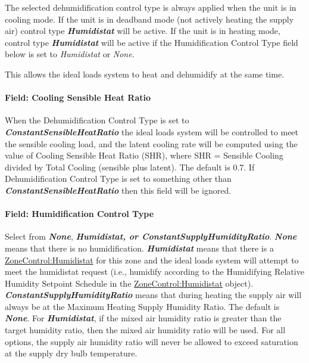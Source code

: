 The selected dehumidification control type is always applied when the unit is in cooling mode. If the unit is in deadband mode (not actively heating the supply air) control type \textbf{\emph{Humidistat}} will be active. If the unit is in heating mode, control type \textbf{\emph{Humidistat}} will be active if the Humidification Control Type field below is set to \emph{Humidistat} or \emph{None}.

This allows the ideal loads system to heat and dehumidify at the same time.

\paragraph{Field: Cooling Sensible Heat Ratio}\label{field-cooling-sensible-heat-ratio-000}

When the Dehumidification Control Type is set to \textbf{\emph{ConstantSensibleHeatRatio}} the ideal loads system will be controlled to meet the sensible cooling load, and the latent cooling rate will be computed using the value of Cooling Sensible Heat Ratio (SHR), where SHR = Sensible Cooling divided by Total Cooling (sensible plus latent). The default is 0.7. If Dehumidification Control Type is set to something other than \textbf{\emph{ConstantSensibleHeatRatio}} then this field will be ignored.

\paragraph{Field: Humidification Control Type}\label{field-humidification-control-type-000}

Select from \textbf{\emph{None}}, \textbf{\emph{Humidistat, or ConstantSupplyHumidityRatio}}. \textbf{\emph{None}} means that there is no humidification. \textbf{\emph{Humidistat}} means that there is a \hyperref[zonecontrolhumidistat]{ZoneControl:Humidistat} for this zone and the ideal loads system will attempt to meet the humidistat request (i.e., humidify according to the Humidifying Relative Humidity Setpoint Schedule in the \hyperref[zonecontrolhumidistat]{ZoneControl:Humidistat} object). \textbf{\emph{ConstantSupplyHumidityRatio}} means that during heating the supply air will always be at the Maximum Heating Supply Humidity Ratio. The default is \textbf{\emph{None}}. For \textbf{\emph{Humidistat}}, if the mixed air humidity ratio is greater than the target humidity ratio, then the mixed air humidity ratio will be used. For all options, the supply air humidity ratio will never be allowed to exceed saturation at the supply dry bulb temperature.

